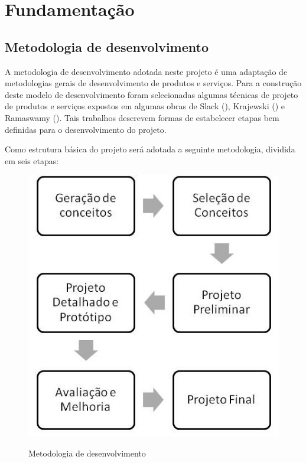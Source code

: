 \chapter[Fundamentação]{Fundamentação}

  \section{Metodologia de desenvolvimento}
  
  A metodologia de desenvolvimento adotada neste projeto é uma adaptação de metodologias gerais de desenvolvimento de
  produtos e serviços. Para a construção deste modelo de desenvolvimento foram selecionadas algumas técnicas de projeto
  de produtos e serviços expostos em algumas obras de Slack (\citeyear{slack99}), Krajewski (\citeyear{krajewski96}) e
  Ramaswamy (\citeyear{ramaswamy96}). Tais trabalhos descrevem formas de estabelecer etapas bem definidas para o desenvolvimento do projeto.
  
  Como estrutura básica do projeto será adotada a seguinte metodologia, dividida em seis etapas:
  
  \begin{figure}[h]
  \begin{center}

  \includegraphics[scale=0.3]{editaveis/figuras/metodologia_de_desenvolvimento}
  \label{Metodologia de desenvolvimento}
  \caption{Metodologia de desenvolvimento}
  \end{center}
  \end{figure}
  \FloatBarrier
  
